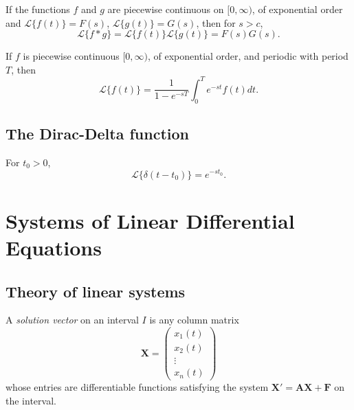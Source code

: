 \documentclass{article}
\begin{document}
\begin{thm} 
    If the functions \(f\) and \(g\) are piecewise continuous on \([0,\infty)\), of exponential order and \(\mathcal{L} \{f(t)\} = F(s)\), \(\mathcal{L} \{g(t)\} = G(s)\), then for \(s > c\),
    \begin{equation}
        \mathcal{L} \{f*g\} = \mathcal{L} \{f(t)\} \mathcal{L} \{g(t)\} = F(s)G(s).
    \end{equation}
\end{thm}

\begin{thm} 
    If \(f\) is piecewise continuous \([0,\infty)\), of exponential order, and periodic with period \(T\), then
    \begin{equation}
        \mathcal{L} \{f(t)\} = \frac{1}{1-e^{-sT}} \int_0^T e^{-st} f(t) dt.
    \end{equation}
\end{thm}

\subsection{The Dirac-Delta function}

\begin{thm} 
    For \(t_0 > 0\),
    \begin{equation}
        \mathcal{L} \{\delta(t - t_0)\} = e^{-st_0}.
    \end{equation}
\end{thm}

\section{Systems of Linear Differential Equations}

\subsection{Theory of linear systems}

\begin{defn} 
    A \emph{solution vector} on an interval \(I\) is any column matrix
    \begin{equation}
        \mathbf{X} = \begin{pmatrix}
            x_1(t) \\
            x_2(t) \\
            \vdots \\
            x_n(t)
        \end{pmatrix}
    \end{equation}
    whose entries are differentiable functions satisfying the system \(\mathbf{X'} = \mathbf{AX} + \mathbf{F}\) on the interval.
\end{defn}
\end{document}
